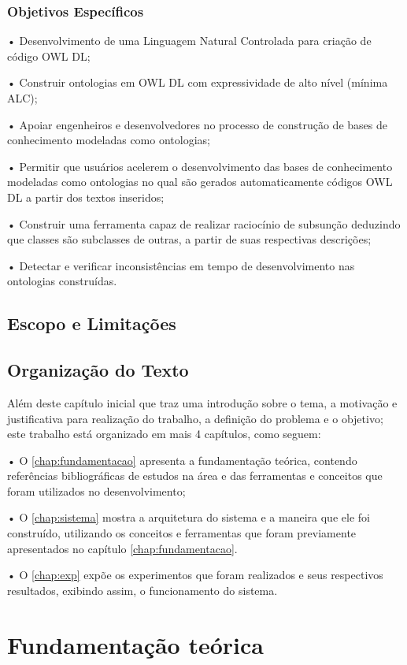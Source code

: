 \documentclass{bcc}
\begin{document}
\subsection{Objetivos Específicos}
•	Desenvolvimento de uma Linguagem Natural Controlada para criação de código OWL DL;

•	Construir ontologias em OWL DL com expressividade de alto nível (mínima ALC);

•	Apoiar engenheiros e desenvolvedores no processo de construção de bases de conhecimento modeladas como ontologias;

•	Permitir que usuários acelerem o desenvolvimento das bases de conhecimento modeladas como ontologias no qual são gerados automaticamente códigos OWL DL a partir dos textos inseridos;

•	Construir uma ferramenta capaz de realizar raciocínio de subsunção deduzindo que classes são subclasses de outras, a partir de suas respectivas descrições;

•	Detectar e verificar inconsistências em tempo de desenvolvimento nas ontologias construídas.


\section{Escopo e Limitações}

\section{Organização do Texto}

Além deste capítulo inicial que traz uma introdução sobre o tema, a motivação e justificativa para realização do trabalho, a definição do problema e o objetivo; este trabalho está organizado em mais 4 capítulos, como seguem:

• O \autoref{chap:fundamentacao} apresenta a fundamentação teórica, contendo referências bibliográficas de estudos na área e das ferramentas e conceitos que foram utilizados no desenvolvimento;

• O \autoref{chap:sistema} mostra a arquitetura do sistema e a maneira que ele foi construído, utilizando os conceitos e ferramentas que foram previamente apresentados no capítulo \autoref{chap:fundamentacao}.

• O \autoref{chap:exp} expõe os experimentos que foram realizados e seus respectivos resultados, exibindo assim, o funcionamento do sistema.


\chapter{Fundamentação teórica}
\label{chap:fundamentacao}
\end{document}
